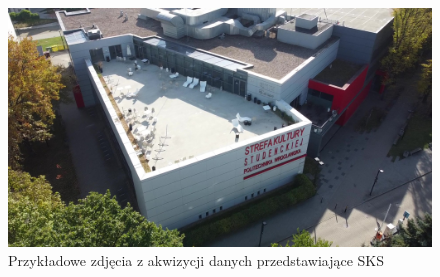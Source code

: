 \begin{figure}[h!]
\begin{minipage}{0.245\textwidth}
    \end{minipage}
    \hfill
    \begin{minipage}{0.245\textwidth}
        \centering
        \includegraphics[width=\textwidth]{images/sks_dataset_4.jpg}
    \end{minipage}
    \caption{Przykładowe zdjęcia z akwizycji danych przedstawiające SKS}
    \label{fig:four-photos}
\end{figure}